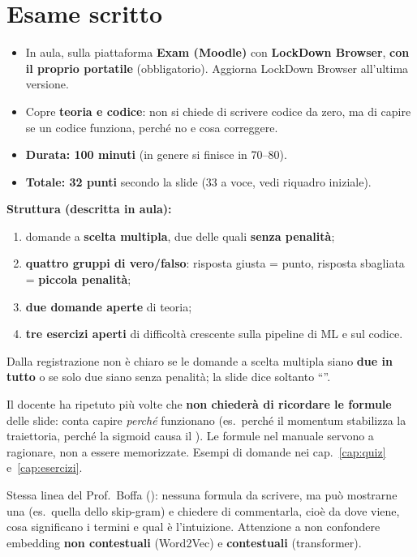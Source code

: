 \section{Esame scritto}
\begin{itemize}
  \item In aula, sulla piattaforma \textbf{Exam (Moodle)} con \textbf{LockDown Browser},
        \textbf{con il proprio portatile} (obbligatorio). Aggiorna LockDown Browser all'ultima versione.
  \item Copre \textbf{teoria e codice}: non si chiede di scrivere codice da zero, ma di capire se
        un codice funziona, perché no e cosa correggere.
  \item \textbf{Durata: 100 minuti} (in genere si finisce in 70--80).
  \item \textbf{Totale: 32 punti} secondo la slide (33 a voce, vedi riquadro iniziale).
\end{itemize}

\textbf{Struttura (descritta in aula):}
\begin{enumerate}
  \item domande a \textbf{scelta multipla}, due delle quali \textbf{senza penalità};
  \item \textbf{quattro gruppi di vero/falso}: risposta giusta = punto, risposta sbagliata = \textbf{piccola penalità};
  \item \textbf{due domande aperte} di teoria;
  \item \textbf{tre esercizi aperti} di difficoltà crescente sulla pipeline di ML e sul codice.
\end{enumerate}

\begin{verifica}
Dalla registrazione non è chiaro se le domande a scelta multipla siano \textbf{due in tutto} o se solo
due siano senza penalità; la slide dice soltanto ``''.
\end{verifica}

\begin{esame}
Il docente ha ripetuto più volte che \textbf{non chiederà di ricordare le formule} delle slide:
conta capire \emph{perché} funzionano (es.\ perché il momentum stabilizza la traiettoria,
perché la sigmoid causa il ). Le formule nel manuale servono a
ragionare, non a essere memorizzate. Esempi di domande nei cap.~\ref{cap:quiz} e~\ref{cap:esercizi}.
\end{esame}

\begin{esame}
Stessa linea del Prof.~Boffa (): nessuna formula da scrivere, ma può mostrarne una (es.\ quella dello
skip-gram) e chiedere di commentarla, cioè da dove viene, cosa significano i termini e qual è l'intuizione. Attenzione a non
confondere embedding \textbf{non contestuali} (Word2Vec) e \textbf{contestuali} (transformer).
\end{esame}

